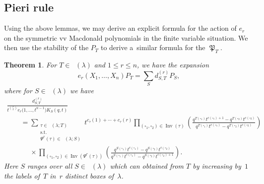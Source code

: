 \documentclass[pdftex]{sigma}
\numberwithin{equation}{section}
\newtheorem{Theorem}{Theorem}[section]
\theoremstyle{definition}
\DeclareMathOperator{\PSYT}{\mathrm{PSYT}_{\geq 0}}
\DeclareMathOperator{\RSSYT}{\mathrm{RSSYT}_{\geq 0}}
\DeclareMathOperator{\MacD}{\mathfrak{P}}
\DeclareMathOperator{\Inv}{\mathrm{Inv}}
\begin{document}
\subsection{Pieri rule}

Using the above lemmas, we may derive an explicit formula for the action of $e_r$ on the symmetric vv Macdonald polynomials in the finite variable situation. We then use the stability of the $P_T$ to derive a~similar formula for the $\MacD_{T}$.

\begin{Theorem}\label{Pieri Rule for Finite vars}
 For $T \in \RSSYT(\lambda)$ and $1 \leq r \leq n$, we have the expansion
 \[
 e_r(X_1,\dots, X_n)P_T = \sum_{S} d^{(r)}_{S,T} P_{S},
 \]
 where for $S \in \RSSYT(\lambda)$ we have
 \begin{gather*}
 \frac{d^{(r)}_{S,T}}{t^{ {r\choose 2}}e_r\bigl(1,\dots, t^{n-1}\bigr)K_{S}(q,t)} \\
 \qquad = \sum_{\substack{\tau \in \PSYT(\lambda;T) \\ \text{s.t.}\\ \Psi^r(\tau) \in \PSYT(\lambda;S)}}
 t^{c_{\tau}(1)+\cdots + c_{\tau}(r)}
 \prod_{(\square_1,\square_2) \in \Inv(\tau)} \left( \frac{q^{T(\square_1)}t^{c(\square_1) +1} - q^{T(\square_2)}t^{c(\square_2)}}{q^{T(\square_1)}t^{c(\square_1)} - q^{T(\square_2)}t^{c(\square_2)}} \right) \\
 \phantom{ \qquad = }{} \times \prod_{(\square_1,\square_2) \in \Inv(\Psi^r(\tau))} \left( \frac{q^{S(\square_1)}t^{c(\square_1)} - q^{S(\square_2)}t^{c(\square_2)}}{q^{S(\square_1)}t^{c(\square_1)} - q^{S(\square_2)}t^{c(\square_2) +1}} \right).
 \end{gather*}
Here $S$ ranges over all $S \in \RSSYT(\lambda)$ which can obtained from $T$ by increasing by~$1$ the labels of~$T$ in~$r$ distinct boxes of~$\lambda$.
\end{Theorem}
\end{document}
